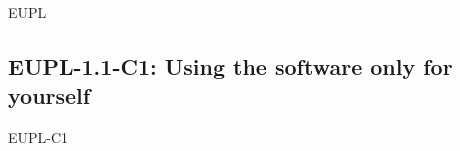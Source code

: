 \begin{license}{EUPL}
\newcommand{\markAllProgramModifications}{
  \auxMarkAllModifications{program}}
\newcommand{\markAllLibraryModifications}{%
  \auxMarkAllModifications{library}}
\newcommand{\markAllEmbeddedModifications}{%
  \auxMarkAllModifications{embedded library}}

\newcommand{\auxApplyCopyleft}[1]{License your program, which includes the
  library, also under the EUPL-1.1.  Arrange the #1 of the on-top development in 
  a way that they are also covered by the EUPL-1.1 licensing statements.}

\newcommand{\applyCopyleftToSources}{\auxApplyCopyleft{sources}}
\newcommand{\applyCopyleftToBinaries}{\auxApplyCopyleft{binaries}}


\newcommand{\auxNewSources}{If you add new source
  code files, insert a header containing your copyright line and an EUPL-1.1
  adequate licensing the statement.}

\newcommand{\auxArrangeModifications}{Arrange your modifications in a way that
  they are covered by the existing EUPL-1.1 licensing statements.}

\newcommand{\arrangeBinaryModifications}{\auxArrangeModifications}
\newcommand{\arrangeSourceModifications}{\auxArrangeModifications\ \auxNewSources}


\newcommand{\addModificationTextFile}{Create a \emph{modification text file}, 
  if such a file still does not exist. \emph{Add} a description of your
  modifications to the \emph{modification text file.}}


\newcommand{\copyrightDialog}{Let the copyright dialog of the on-top development
  clearly say, that it uses the EUPL-1.1 licensed library and that it is itself
  licensed under the EUPL-1.1, too.}

\subsection{EUPL-1.1-C1: Using the software only for yourself}
\begin{lsuc}{EUPL-C1}


\end{lsuc}
\end{license}
